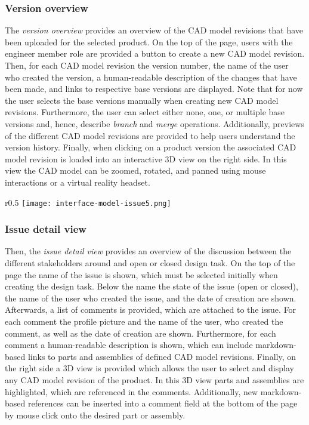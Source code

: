 \subsubsection{Version overview}

The \textit{version overview} provides an overview of the CAD model revisions that have been uploaded for the selected product.
On the top of the page, users with the engineer member role are provided a button to create a new CAD model revision.
Then, for each CAD model revision the version number, the name of the user who created the version, a human-readable description of the changes that have been made, and links to respective base versions are displayed.
Note that for now the user selects the base versions manually when creating new CAD model revisions.
Furthermore, the user can select either none, one, or multiple base versions and, hence, describe \textit{branch} and \textit{merge} operations.
Additionally, previews of the different CAD model revisions are provided to help users understand the version history.
Finally, when clicking on a product version the associated CAD model revision is loaded into an interactive 3D view on the right side.
In this view the CAD model can be zoomed, rotated, and panned using mouse interactions or a virtual reality headset.

\begin{wrapfigure}{r}{0.5\textwidth}
    \centering
    \texttt{[image: interface-model-issue5.png]}
    \label{fig:screenshot-issue}
\end{wrapfigure}

\subsubsection{Issue detail view}

Then, the \textit{issue detail view} provides an overview of the discussion between the different stakeholders around and open or closed design task.
On the top of the page the name of the issue is shown, which must be selected initially when creating the design task.
Below the name the state of the issue (open or closed), the name of the user who created the issue, and the date of creation are shown.
Afterwards, a list of comments is provided, which are attached to the issue.
For each comment the profile picture and the name of the user, who created the comment, as well as the date of creation are shown.
Furthermore, for each comment a human-readable description is shown, which can include markdown-based links to parts and assemblies of defined CAD model revisions.
Finally, on the right side a 3D view is provided which allows the user to select and display any CAD model revision of the product.
In this 3D view parts and assemblies are highlighted, which are referenced in the comments.
Additionally, new markdown-based references can be inserted into a comment field at the bottom of the page by mouse click onto the desired part or assembly.

